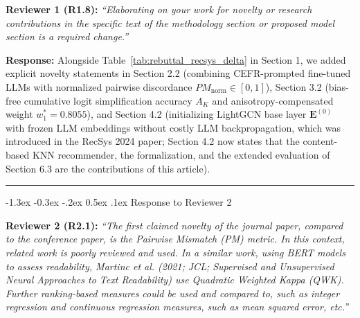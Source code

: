 \documentclass[11pt,a4paper]{article}
\makeatletter
\newcommand{\mm}[1]{#1}
\renewcommand\section{\@startsection {section}{1}{\z@}%
  {-1.3ex \@plus -0.3ex \@minus -.2ex}%
  {0.5ex \@plus.1ex}%
  {\normalfont\large\bfseries}}
\makeatother
\begin{document}
\begin{reviewbox}
\textbf{Reviewer 1 (R1.8):} \textit{``Elaborating on your work for novelty or research contributions in the specific text of the methodology section or proposed model section is a required change.''}
\end{reviewbox}

\noindent\textbf{Response:}
Alongside Table~\ref{tab:rebuttal_recsys_delta} in Section 1, we added explicit novelty statements in Section 2.2 (combining CEFR-prompted fine-tuned LLMs with normalized pairwise discordance $PM_{\text{norm}} \in [0, 1]$), Section 3.2 (bias-free cumulative logit simplification accuracy $A_K$ and anisotropy-compensated weight $w_1^* = 0.8055$), and Section 4.2 (initializing LightGCN base layer $\mathbf{E}^{(0)}$ with frozen LLM embeddings without costly LLM backpropagation\mm{, which was introduced in the RecSys 2024 paper; Section 4.2 now states that the content-based KNN recommender, the formalization, and the extended evaluation of Section 6.3 are the contributions of this article}).

\medskip
\noindent\rule{\textwidth}{0.4pt}

\section{Response to Reviewer 2}

\begin{reviewbox}
\textbf{Reviewer 2 (R2.1):} \textit{``The first claimed novelty of the journal paper, compared to the conference paper, is the Pairwise Mismatch (PM) metric. In this context, related work is poorly reviewed and used. In a similar work, using BERT models to assess readability, Martinc et al. (2021; JCL; Supervised and Unsupervised Neural Approaches to Text Readability) use Quadratic Weighted Kappa (QWK). Further ranking-based measures could be used and compared to, such as integer regression and continuous regression measures, such as mean squared error, etc.''}
\end{reviewbox}
\end{document}
